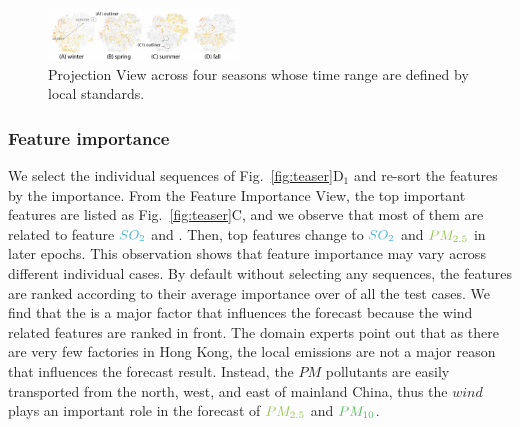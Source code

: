 
\begin{figure}[t]
	\centering
	\includegraphics[width=0.45\textwidth]{pictures/Evaluation/seasonal_behavior.pdf}
	\vspace{-3mm}
	\caption{Projection View across four seasons whose time range are defined by local standards.}
	\label{fig:seasonal_feature}
	\vspace{-4mm}
\end{figure}

\subsubsection{Feature importance}
We select the individual sequences of Fig.~\ref{fig:teaser}D$_1$ and re-sort the features by the importance. 
From the Feature Importance View, the top important features are listed as Fig.~\ref{fig:teaser}C, and we observe that most of them are related to feature $\color{SO2Color}{SO_{2}}$ and \textit{\color{WINDColor}{Wind Speed}}.
Then, top features change to $\color{SO2Color}{SO_2}$ and $\color{PM25Color}{PM_{2.5}}$ in later epochs. 
This observation shows that feature importance may vary across different individual cases. 
By default without selecting any sequences, the features are ranked according to their average importance over of all the test cases. 
We find that the \textit{\color{WINDColor}{Wind Speed}} is a major factor that influences the forecast because the wind related features are ranked in front.
The domain experts point out that as there are very few factories in Hong Kong, the local emissions are not a major reason that influences the forecast result. 
Instead, the $PM$ pollutants are easily transported from the north, west, and east of mainland China, thus the $wind$ plays an important role in the forecast of $\color{PM25Color}{PM_{2.5}}$ and $\color{PM10Color}{PM_{10}}$.

